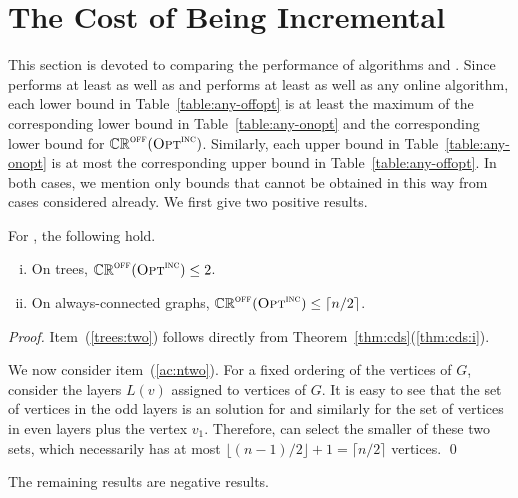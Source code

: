 \section{The Cost of Being Incremental}
\label{sec:offline}
This section is devoted to comparing the performance of
\incr algorithms and \offopt.
Since \offopt{} performs at least as well as \onopt and \onopt
performs at least as well as any online algorithm, each lower bound
in Table~\ref{table:any-offopt} is at least the maximum of
the corresponding lower bound in Table~\ref{table:any-onopt} and
the corresponding lower bound for $\mathbb{CR}^{\textsc{off}}(\operatorname{\textsc{Opt}}^\textsc{\ensuremath{\text{inc}}})$.
Similarly, each upper bound in Table~\ref{table:any-onopt} is at most
the corresponding upper bound in
Table~\ref{table:any-offopt}.
In both cases, we mention only bounds
that cannot be obtained in this way from cases considered already.
We first give two positive results.

\begin{proposition}
For \ds, the following hold.
\begin{enumerate}[(i)]
\item \label{trees:two}
 On trees, $\mathbb{CR}^{\textsc{off}}(\operatorname{\textsc{Opt}}^\textsc{\ensuremath{\text{inc}}}) \le 2$.
\item \label{ac:ntwo}
 On always-connected graphs, $\mathbb{CR}^{\textsc{off}}(\operatorname{\textsc{Opt}}^\textsc{\ensuremath{\text{inc}}}) \le \lceil n/2 \rceil$.
\end{enumerate}
\end{proposition}
\begin{proof}
Item~(\ref{trees:two}) follows directly from
Theorem~\ref{thm:cds}(\ref{thm:cds:i}).

We now consider item~(\ref{ac:ntwo}).
For a fixed ordering of the vertices of $G$, consider the layers
$L(v)$ assigned
to vertices of $G$. It is easy to see that the set of vertices
in the odd layers is an \incr solution for \ds and similarly
for the set of vertices in even layers plus the vertex $v_1$. Therefore,
\onopt can select the smaller of these two sets, which necessarily
has at most $\lfloor (n-1)/2 \rfloor +1 = \lceil n/2 \rceil$ vertices.
\qed\end{proof}

The remaining results are negative results.

